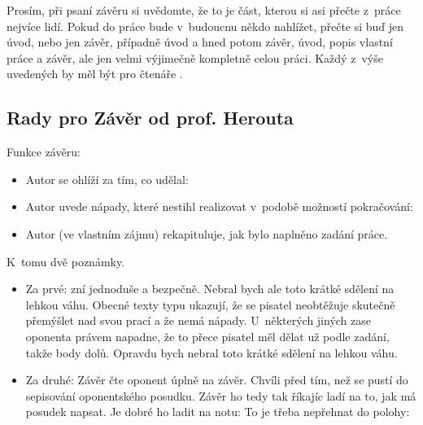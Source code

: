 Prosím, při psaní závěru si uvědomte, že to je část, kterou si asi přečte z~práce nejvíce lidí. Pokud do práce bude v~budoucnu někdo nahlížet, přečte si buď jen úvod, nebo jen závěr, případně úvod a hned potom závěr, úvod, popis vlastní práce a závěr, ale jen velmi výjimečně kompletně celou práci. Každý z~výše uvedených  by měl být pro čtenáře . 


\subsection*{Rady pro Závěr od prof. Herouta}
Funkce závěru:

\begin{itemize}
  \item{Autor se ohlíží za tím, co udělal: }
  \item{Autor uvede nápady, které nestihl realizovat v~podobě možností pokračování: }
  \item{Autor (ve vlastním zájmu) rekapituluje, jak bylo naplněno zadání práce.}
\end{itemize}

\begin{samepage}
\noindent K~tomu dvě poznámky.
\begin{itemize}
  \item{Za prvé:  zní jednoduše a bezpečně. Nebral bych ale toto krátké sdělení na lehkou váhu. Obecné texty typu  ukazují, že se pisatel neobtěžuje skutečně přemýšlet nad svou prací a že nemá nápady. U~některých jiných  zase oponenta právem napadne, že to přece pisatel měl dělat už podle zadání, takže body dolů. Opravdu bych nebral toto krátké sdělení na lehkou váhu.}
  \item{Za druhé: Závěr čte oponent úplně na závěr. Chvíli před tím, než se pustí do sepisování oponentského posudku. Závěr ho tedy tak říkajíc ladí na to, jak má posudek napsat. Je dobré ho ladit na notu:  To je třeba nepřehnat do polohy: }
\end{itemize}
\end{samepage}

